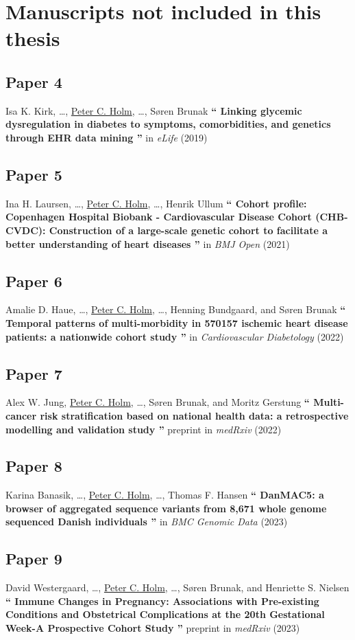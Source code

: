 \clearpage
\section*{Manuscripts not included in this thesis}

\subsection*{Paper 4}
Isa K. Kirk, \ldots, 
\underline{Peter C. Holm},
\ldots, Søren Brunak
\textbf{\enquote{%
    Linking glycemic dysregulation in diabetes to symptoms, 
    comorbidities, and genetics through EHR data mining
}}
in \textit{eLife} (2019)

\subsection*{Paper 5}
Ina H. Laursen, \ldots, 
\underline{Peter C. Holm},
\ldots, Henrik Ullum
\textbf{\enquote{%
    Cohort profile: Copenhagen Hospital Biobank - Cardiovascular Disease Cohort
    (CHB-CVDC): Construction of a large-scale genetic cohort to facilitate a
    better understanding of heart diseases
}}
in \textit{BMJ Open} (2021)

\subsection*{Paper 6}
Amalie D. Haue, \ldots, 
\underline{Peter C. Holm},
\ldots, Henning Bundgaard, and Søren Brunak
\textbf{\enquote{%
    Temporal patterns of multi-morbidity in 
    570157 ischemic heart disease patients: 
    a nationwide cohort study
}}
in \textit{Cardiovascular Diabetology} (2022)

\subsection*{Paper 7}
Alex W. Jung, 
\underline{Peter C. Holm}, \ldots, 
Søren Brunak, and 
Moritz Gerstung
\textbf{\enquote{%
    Multi-cancer risk stratification based on national health data: a
    retrospective modelling and validation study
}}
preprint in \textit{medRxiv} (2022)

\subsection*{Paper 8}
Karina Banasik, \ldots, 
\underline{Peter C. Holm}, \ldots, 
Thomas F. Hansen
\textbf{\enquote{%
    DanMAC5: a browser of aggregated sequence variants from 8,671 whole genome
    sequenced Danish individuals
}}
in \textit{BMC Genomic Data} (2023)

\subsection*{Paper 9}
David Westergaard, \ldots, 
\underline{Peter C. Holm}, \ldots, 
Søren Brunak, and 
Henriette S. Nielsen
\textbf{\enquote{%
    Immune Changes in Pregnancy: Associations with Pre-existing Conditions and
    Obstetrical Complications at the 20th Gestational Week-A Prospective Cohort
    Study
}}
preprint in \textit{medRxiv} (2023)

